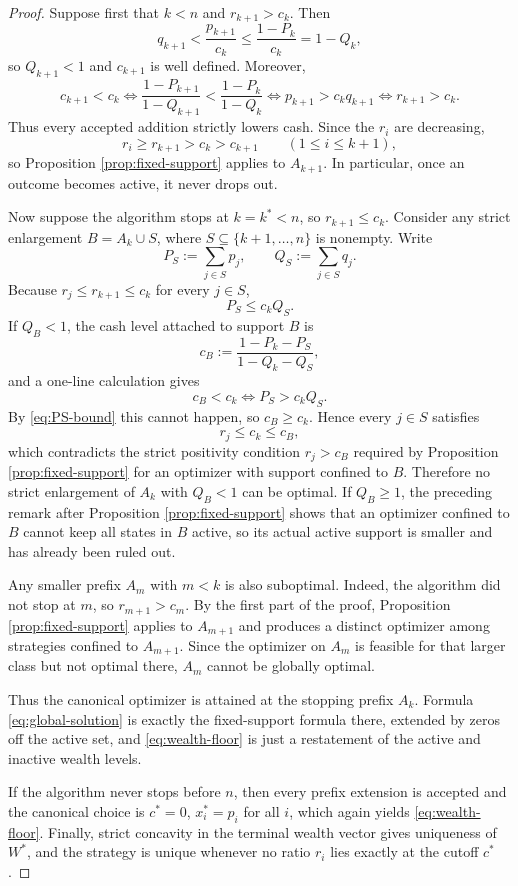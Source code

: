 \documentclass[11pt]{article}
\begin{document}
\begin{proof}
Suppose first that $k<n$ and $r_{k+1}>c_k$. Then
\[
  q_{k+1}<\frac{p_{k+1}}{c_k}\le \frac{1-P_k}{c_k}=1-Q_k,
\]
so $Q_{k+1}<1$ and $c_{k+1}$ is well defined. Moreover,
\[
  c_{k+1}<c_k
  \iff \frac{1-P_{k+1}}{1-Q_{k+1}}<\frac{1-P_k}{1-Q_k}
  \iff p_{k+1}>c_kq_{k+1}
  \iff r_{k+1}>c_k.
\]
Thus every accepted addition strictly lowers cash. Since the $r_i$ are decreasing,
\[
  r_i\ge r_{k+1}>c_k>c_{k+1} \qquad (1\le i\le k+1),
\]
so Proposition \ref{prop:fixed-support} applies to $A_{k+1}$. In particular, once an outcome becomes active, it never drops out.

Now suppose the algorithm stops at $k=k^*<n$, so $r_{k+1}\le c_k$. Consider any strict enlargement $B=A_k\cup S$, where $S\subseteq\{k+1,\dots,n\}$ is nonempty. Write
\[
  P_S:=\sum_{j\in S} p_j,
  \qquad
  Q_S:=\sum_{j\in S} q_j.
\]
Because $r_j\le r_{k+1}\le c_k$ for every $j\in S$,
\begin{equation}\label{eq:PS-bound}
  P_S\le c_kQ_S.
\end{equation}
If $Q_B<1$, the cash level attached to support $B$ is
\[
  c_B:=\frac{1-P_k-P_S}{1-Q_k-Q_S},
\]
and a one-line calculation gives
\[
  c_B<c_k \iff P_S>c_kQ_S.
\]
By \eqref{eq:PS-bound} this cannot happen, so $c_B\ge c_k$. Hence every $j\in S$ satisfies
\[
  r_j\le c_k\le c_B,
\]
which contradicts the strict positivity condition $r_j>c_B$ required by Proposition \ref{prop:fixed-support} for an optimizer with support confined to $B$. Therefore no strict enlargement of $A_k$ with $Q_B<1$ can be optimal. If $Q_B\ge 1$, the preceding remark after Proposition \ref{prop:fixed-support} shows that an optimizer confined to $B$ cannot keep all states in $B$ active, so its actual active support is smaller and has already been ruled out.

Any smaller prefix $A_m$ with $m<k$ is also suboptimal. Indeed, the algorithm did not stop at $m$, so $r_{m+1}>c_m$. By the first part of the proof, Proposition \ref{prop:fixed-support} applies to $A_{m+1}$ and produces a distinct optimizer among strategies confined to $A_{m+1}$. Since the optimizer on $A_m$ is feasible for that larger class but not optimal there, $A_m$ cannot be globally optimal.

Thus the canonical optimizer is attained at the stopping prefix $A_k$. Formula \eqref{eq:global-solution} is exactly the fixed-support formula there, extended by zeros off the active set, and \eqref{eq:wealth-floor} is just a restatement of the active and inactive wealth levels.

If the algorithm never stops before $n$, then every prefix extension is accepted and the canonical choice is $c^*=0$, $x_i^*=p_i$ for all $i$, which again yields \eqref{eq:wealth-floor}. Finally, strict concavity in the terminal wealth vector gives uniqueness of $W^*$, and the strategy is unique whenever no ratio $r_i$ lies exactly at the cutoff $c^*$.
\end{proof}
\end{document}

